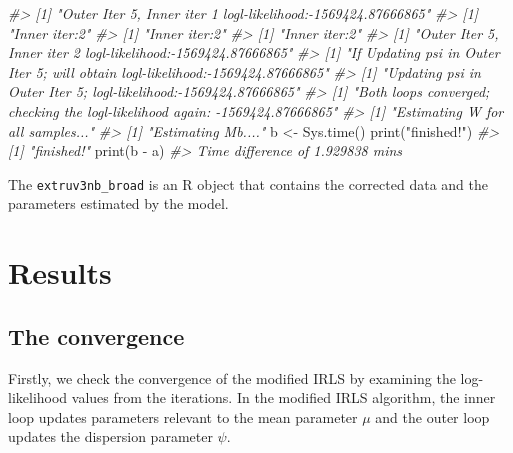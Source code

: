 \documentclass[]{article}
\newcommand{\hlstr}[1]{\textcolor[rgb]{0.251,0.627,0.251}{#1}}%
\newcommand{\hlcom}[1]{\textcolor[rgb]{0.502,0.502,0.502}{\textit{#1}}}%
\newcommand{\hlstd}[1]{\textcolor[rgb]{0.251,0.251,0.251}{#1}}%
\newenvironment{Shaded}{\begin{myshaded}}{\end{myshaded}}
\newcommand{\SpecialCharTok}[1]{\hlstr{#1}}
\newcommand{\StringTok}[1]{\hlstr{#1}}
\newcommand{\CommentTok}[1]{\hlcom{#1}}
\newcommand{\OtherTok}[1]{{#1}}
\newcommand{\FunctionTok}[1]{\hlstd{#1}}
\newcommand{\NormalTok}[1]{\hlstd{#1}}
\begin{document}
\begin{Shaded}
\begin{Highlighting}[]
\CommentTok{\#\textgreater{} [1] "Outer Iter 5, Inner iter 1 logl{-}likelihood:{-}1569424.87666865"}
\CommentTok{\#\textgreater{} [1] "Inner iter:2"}
\CommentTok{\#\textgreater{} [1] "Inner iter:2"}
\CommentTok{\#\textgreater{} [1] "Inner iter:2"}
\CommentTok{\#\textgreater{} [1] "Outer Iter 5, Inner iter 2 logl{-}likelihood:{-}1569424.87666865"}
\CommentTok{\#\textgreater{} [1] "If Updating psi in Outer Iter 5; will obtain logl{-}likelihood:{-}1569424.87666865"}
\CommentTok{\#\textgreater{} [1] "Updating psi in Outer Iter 5; logl{-}likelihood:{-}1569424.87666865"}
\CommentTok{\#\textgreater{} [1] "Both loops converged; checking the logl{-}likelihood again: {-}1569424.87666865"}
\CommentTok{\#\textgreater{} [1] "Estimating W for all samples..."}
\CommentTok{\#\textgreater{} [1] "Estimating Mb...."}
\NormalTok{b }\OtherTok{\textless{}{-}} \FunctionTok{Sys.time}\NormalTok{()}
\FunctionTok{print}\NormalTok{(}\StringTok{"finished!"}\NormalTok{)}
\CommentTok{\#\textgreater{} [1] "finished!"}
\FunctionTok{print}\NormalTok{(b }\SpecialCharTok{{-}}\NormalTok{ a)}
\CommentTok{\#\textgreater{} Time difference of 1.929838 mins}
\end{Highlighting}
\end{Shaded}

The \texttt{extruv3nb\_broad} is an R object that contains the corrected data and the parameters estimated by the model.

\section{Results}\label{results}

\subsection{The convergence}\label{the-convergence}

Firstly, we check the convergence of the modified IRLS by examining the log-likelihood values from the iterations. In the modified IRLS algorithm, the inner loop updates parameters relevant to the mean parameter \(\mu\) and the outer loop updates the dispersion parameter \(\psi\).
\end{document}
